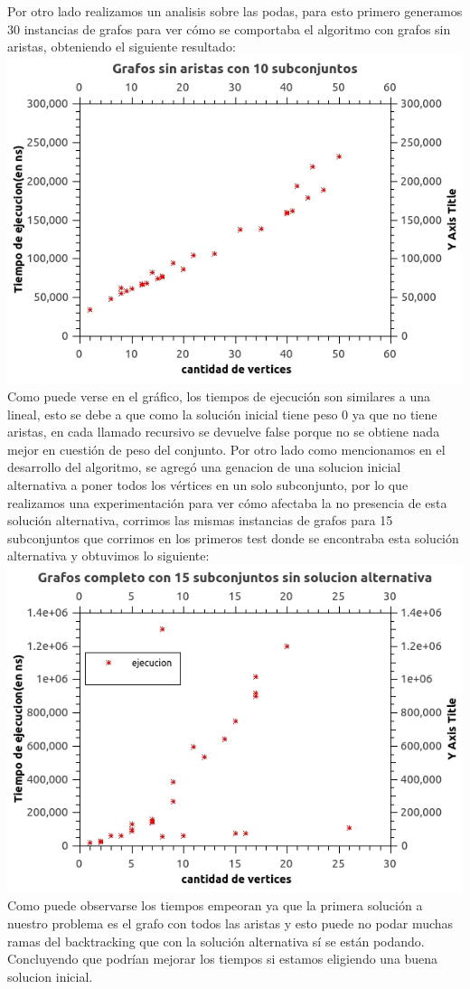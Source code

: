 Por otro lado realizamos un analisis sobre las podas, para esto primero generamos 30 instancias de grafos para ver cómo se comportaba el algoritmo con grafos sin aristas, obteniendo el siguiente resultado:\\
\includegraphics[scale=0.5]{Ej2/sinAristas.jpg}\\
Como puede verse en el gráfico, los tiempos de ejecución son similares a una lineal, esto se debe a que como la solución inicial tiene peso 0 ya que no tiene aristas, en cada llamado recursivo se devuelve false porque no se obtiene nada mejor en cuestión de peso del conjunto.
Por otro lado como mencionamos en el desarrollo del algoritmo, se agregó una genacion de una solucion inicial alternativa a poner todos los vértices en un solo subconjunto, por lo que realizamos una experimentación para ver cómo afectaba la no presencia de esta solución alternativa, corrimos las mismas instancias de grafos para 15 subconjuntos que corrimos en los primeros test donde se encontraba esta solución alternativa y obtuvimos lo siguiente:\\
\includegraphics[scale=0.5]{Ej2/sinAlternativa.jpg}\\

Como puede observarse los tiempos empeoran ya que la primera solución a nuestro problema es el grafo con todos las aristas y esto puede no podar muchas ramas del backtracking que con la solución alternativa sí se están podando. Concluyendo que podrían mejorar los tiempos si estamos eligiendo una buena solucion inicial.

